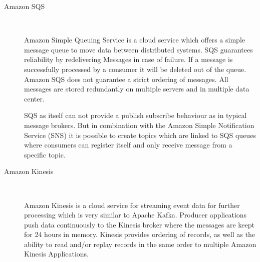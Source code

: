 \begin{description}
    \item [Amazon SQS] \hfill \\
    {
    Amazon Simple Queuing Service is a cloud service which offers a simple
    message queue to move data between distributed systems. SQS guarantees
    reliability by redelivering Messages in case of failure. If a message is
    successfully processed by a consumer it will be deleted out of the queue.
    Amazon SQS does not guarantee a strict ordering of messages. All messages
    are stored redundantly on multiple servers and in multiple data center.
    \cite{amazonSQS} \cite{amazonSQSFaq} 

    SQS as itself can not provide a publish subscribe behaviour as in typical
    message brokers. But in combination with the Amazon Simple  Notification
    Service (SNS) it is possible to create topics which are linked to SQS queues
    where consumers can register itself and only receive message from a specific
    topic. \cite{amazonSqsPubSub}
     }
    \item [Amazon Kinesis] \hfill \\
    { 
    Amazon Kinesis is a cloud service for streaming event
    data for further processing which is very similar to Apache Kafka. Producer
    applications push data continuously to the Kinesis broker where the messages
    are keept for 24 hours in memory. Kinesis provides ordering of records, as
    well as the ability to read and/or replay records in the same order to
    multiple Amazon Kinesis Applications.
    \cite{amazonKinesis} \cite{amazonKinesisFAQ} 
    
}
\end{description}
